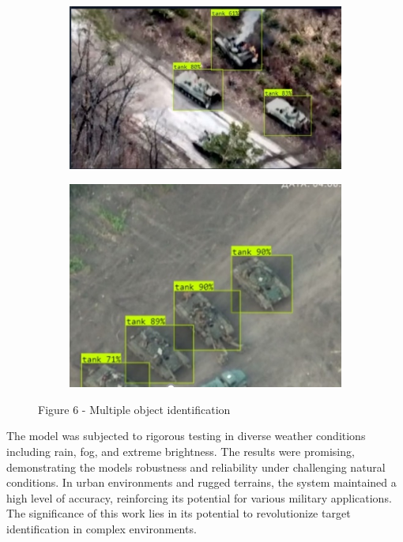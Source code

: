 \begin{figure}[H]
    \centering
    \begin{subfigure}[b]{0.45\textwidth}
        \centering
        \includegraphics[height=0.7\linewidth]{assets/20}
    \end{subfigure}\hfill
    \begin{subfigure}[b]{0.45\textwidth}
        \centering
        \includegraphics[height=0.7\linewidth]{assets/19}
    \end{subfigure}
	\caption*{Figure 6 - Multiple object identification}
\end{figure}

\begin{multicols}{2}
The model was subjected to rigorous testing in diverse weather
conditions including rain, fog, and extreme brightness. The results were
promising, demonstrating the model\textquotesingle s robustness and
reliability under challenging natural conditions. In urban environments
and rugged terrains, the system maintained a high level of accuracy,
reinforcing its potential for various military applications. The
significance of this work lies in its potential to revolutionize target
identification in complex environments.
\end{multicols}

